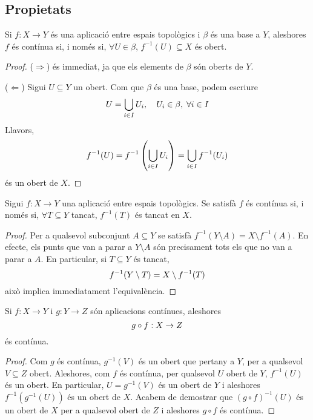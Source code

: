\documentclass[../main.tex]{subfiles}
\begin{document}
\subsection{Propietats}

\begin{prop}
\label{prop:continua1} Si $f:X\rightarrow Y$ és una aplicació entre espais topològics i $\beta$ és una base a $Y$, aleshores $f$ és contínua si, i només si, $\forall U\in\beta$, $f^{-1}(U)\subseteq X$ és obert.
\end{prop}
\begin{proof}
($\Rightarrow$) és immediat, ja que els elements de $\beta$ són oberts de $Y$.

($\Leftarrow$) Sigui $U\subseteq Y$ un obert. Com que $\beta$ és una base, podem escriure
\begin{equation}
    \notag
    U = \bigcup_{i\in I} U_i,\quad U_i\in\beta,\; \forall i\in I
\end{equation}
Llavors,
\begin{equation}
    \notag
    f^{-1}(U) = f^{-1}\left(\bigcup_{i\in I}U_i\right) = \bigcup_{i\in I} f^{-1}(U_i)
\end{equation}
és un obert de $X$.
\end{proof}


\begin{prop}
\label{prop:continua2} Sigui $f:X\rightarrow Y$ una aplicació entre espais topològics. Se satisfà $f$ és contínua si, i només si, $\forall T\subseteq Y$ tancat, $f^{-1}(T)$ és tancat en $X$.
\end{prop}
\begin{proof}
Per a qualsevol subconjunt $A\subseteq Y$ se satisfà $f^{-1}(Y\setminus A) = X\setminus f^{-1}(A)$. En efecte, els punts que van a parar a $Y\setminus A$ són precisament tots els que no van a parar a $A$. En particular, si $T\subseteq Y$ és tancat,
\begin{equation}
    \notag
    f^{-1}(Y\setminus T) = X\setminus f^{-1}(T)
\end{equation}
això implica immediatament l'equivalència.
\end{proof}

\begin{prop}
\label{prop:continua3} Si $f:X\rightarrow Y$ i $g:Y\rightarrow Z$ són aplicacions contínues, aleshores
\begin{equation}
    \notag
    g\circ f:X\rightarrow Z
\end{equation}
és contínua.
\end{prop}
\begin{proof}
Com $g$ és contínua, $g^{-1}(V)$ és un obert que pertany a $Y$, per a qualsevol $V\subseteq Z$ obert. Aleshores, com $f$ és contínua, per qualsevol $U$ obert de $Y$, $f^{-1}(U)$ és un obert. En particular, $U = g^{-1}(V)$ és un obert de $Y$ i aleshores $f^{-1}(g^{-1}(U))$ és un obert de $X$. Acabem de demostrar que $(g\circ f)^{-1}(U)$ és un obert de $X$ per a qualsevol obert de $Z$ i aleshores $g\circ f$ és contínua.
\end{proof}
\end{document}
